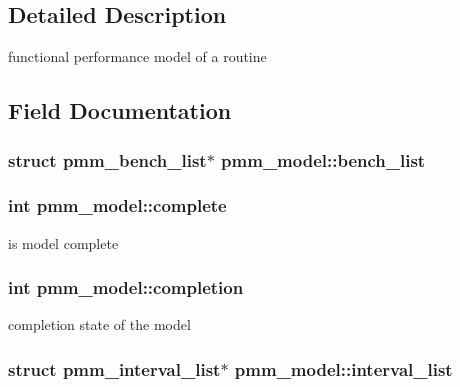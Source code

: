 \subsection{Detailed Description}
functional performance model of a routine 

\subsection{Field Documentation}
\hypertarget{structpmm__model_a024c61407d559a45ca20c076f732eb5c}{
\subsubsection[{bench\-\_\-list}]{\setlength{\rightskip}{0pt plus 5cm}struct {\bf pmm\-\_\-bench\-\_\-list}$\ast$ pmm\-\_\-model\-::bench\-\_\-list}}\label{structpmm__model_a024c61407d559a45ca20c076f732eb5c}
\hypertarget{structpmm__model_a793e727d1ef15e739b140dacc5cea1f1}{
\subsubsection[{complete}]{\setlength{\rightskip}{0pt plus 5cm}int pmm\-\_\-model\-::complete}}\label{structpmm__model_a793e727d1ef15e739b140dacc5cea1f1}
is model complete \hypertarget{structpmm__model_a8e6211f2cd32b0b31581241bb32a8190}{
\subsubsection[{completion}]{\setlength{\rightskip}{0pt plus 5cm}int pmm\-\_\-model\-::completion}}\label{structpmm__model_a8e6211f2cd32b0b31581241bb32a8190}
completion state of the model \hypertarget{structpmm__model_a11a127e6d5d5c3c28ceceea2d3d31081}{
\subsubsection[{interval\-\_\-list}]{\setlength{\rightskip}{0pt plus 5cm}struct {\bf pmm\-\_\-interval\-\_\-list}$\ast$ pmm\-\_\-model\-::interval\-\_\-list}}\label{structpmm__model_a11a127e6d5d5c3c28ceceea2d3d31081}
